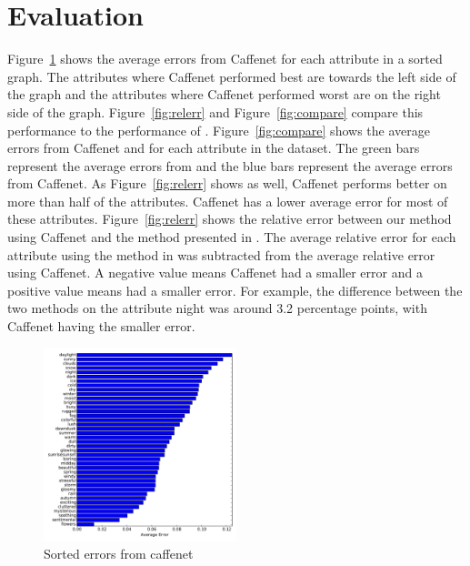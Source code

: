 \documentclass{article}
\newcommand{\figref}[1]{Figure~\ref{fig:#1}}
\begin{document}
\section{Evaluation}
\indent
\figref{sort} shows the average errors from Caffenet for each attribute
in a sorted graph.  The attributes where Caffenet performed best are towards
the left side of the graph and the attributes where Caffenet performed
worst are on the right side of the graph. \figref{relerr} and \figref{compare} 
compare this performance to the performance of \cite{Laffont14}.
\newline\indent
\figref{compare} shows the average errors from Caffenet and \cite{Laffont14}
for each attribute in the dataset.  The green bars represent the average errors
from \cite{Laffont14} and the blue bars represent the average errors from Caffenet.
As \figref{relerr} shows as well, Caffenet performs better on more than half of 
the attributes.  Caffenet has a lower average error for most of these attributes.
\newline\indent
\figref{relerr} shows the relative error between our method using Caffenet
and the method presented in \cite{Laffont14}.  The average relative error 
for each attribute using the method in \cite{Laffont14} was subtracted from
the average relative error using Caffenet.  A negative value means Caffenet
had a smaller error and a positive value means \cite{Laffont14} had a smaller
error.  For example, the difference between the two methods on the attribute
night was around 3.2 percentage points, with Caffenet having the smaller 
error.
\newline\indent

 
 
%
%
%


\begin{figure}[t]
	\centering
		\includegraphics[width=0.5\textwidth]{figs/sorted_err.pdf}
		\caption{Sorted errors from caffenet}\label{fig:sort}
\end{figure}
\end{document}
